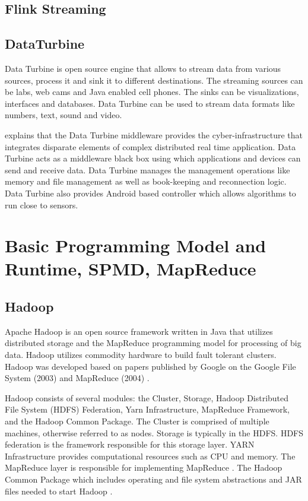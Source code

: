 \subsection{Flink Streaming}
\subsection{DataTurbine}

     Data Turbine \cite{www-data-turbine} is open source engine that
     allows to stream data from various sources, process it and sink
     it to different destinations. The streaming sources can be labs,
     web cams and Java enabled cell phones. The sinks can be
     visualizations, interfaces and databases.  Data Turbine can be
     used to stream data formats like numbers, text, sound and video.

     \cite{osdt-ecologicalsociety} explains that the Data Turbine
     middleware provides the cyber-infrastructure that integrates
     disparate elements of complex distributed real time
     application. Data Turbine acts as a middleware black box using
     which applications and devices can send and receive data. Data
     Turbine manages the management operations like memory and file
     management as well as book-keeping and reconnection logic.  Data
     Turbine also provides Android based controller which allows
     algorithms to run close to sensors.


\section{Basic Programming Model and Runtime, SPMD, MapReduce}
\label{S:o-prg-model}


\subsection{Hadoop}

     Apache Hadoop is an open source framework written in Java that 
     utilizes distributed storage and the MapReduce programming model 
     for processing of big data. Hadoop utilizes commodity hardware to 
     build fault tolerant clusters.  Hadoop was developed based on 
     papers published by Google on the Google File System (2003) and 
     MapReduce (2004) \cite{www-wikihadoop}.

     Hadoop consists of several modules: the Cluster, Storage, Hadoop 
     Distributed File System (HDFS) Federation, Yarn Infrastructure, 
     MapReduce Framework, and the Hadoop Common Package.  The Cluster 
     is comprised of multiple machines, otherwise referred to as nodes.  
     Storage is typically in the HDFS.  HDFS federation is the framework 
     responsible for this storage layer.  YARN Infrastructure provides 
     computational resources such as CPU and memory. The MapReduce layer 
     is responsible for implementing MapReduce \cite{www-hadooparch2}.  
     The Hadoop Common Package which includes operating and file system 
     abstractions and JAR files needed to start Hadoop 
     \cite{www-wikihadoop}. 


